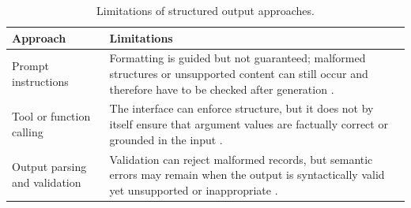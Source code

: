 \begin{table}[H]
    \centering
    \caption{Limitations of structured output approaches.}
    \label{tab:structured-output-approaches}
    \small
    \renewcommand{\arraystretch}{1.2}
    \begin{tabularx}{\textwidth}{
        >{\raggedright\arraybackslash}p{}
        >{\raggedright\arraybackslash}X
    }
        \toprule
        Approach & Limitations \\
        \midrule
        Prompt instructions & Formatting is guided but not guaranteed; malformed structures or unsupported content can still occur and therefore have to be checked after generation \cite{dagdelen2024structured,caufield2024spires}. \\
        Tool or function calling & The interface can enforce structure, but it does not by itself ensure that argument values are factually correct or grounded in the input \cite{caufield2024spires,rankovic2025uncertainty}. \\
        Output parsing and validation & Validation can reject malformed records, but semantic errors may remain when the output is syntactically valid yet unsupported or inappropriate \cite{dagdelen2024structured,rankovic2025uncertainty}. \\
        \bottomrule
    \end{tabularx}
\end{table}